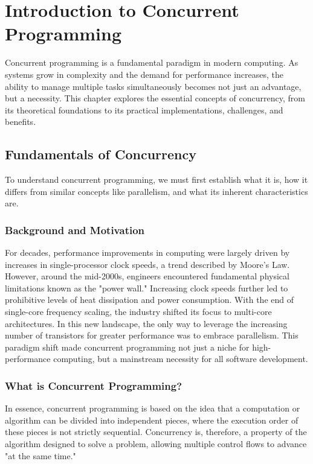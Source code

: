 \chapter{Introduction to Concurrent Programming}

Concurrent programming is a fundamental paradigm in modern computing. As systems grow in complexity and the demand for performance increases, the ability to manage multiple tasks simultaneously becomes not just an advantage, but a necessity. This chapter explores the essential concepts of concurrency, from its theoretical foundations to its practical implementations, challenges, and benefits.

\section{Fundamentals of Concurrency}

To understand concurrent programming, we must first establish what it is, how it differs from similar concepts like parallelism, and what its inherent characteristics are.

\subsection{Background and Motivation}
For decades, performance improvements in computing were largely driven by increases in single-processor clock speeds, a trend described by Moore's Law. However, around the mid-2000s, engineers encountered fundamental physical limitations known as the "power wall." Increasing clock speeds further led to prohibitive levels of heat dissipation and power consumption. With the end of single-core frequency scaling, the industry shifted its focus to multi-core architectures. In this new landscape, the only way to leverage the increasing number of transistors for greater performance was to embrace parallelism. This paradigm shift made concurrent programming not just a niche for high-performance computing, but a mainstream necessity for all software development.

\subsection{What is Concurrent Programming?}

In essence, concurrent programming is based on the idea that a computation or algorithm can be divided into independent pieces, where the execution order of these pieces is not strictly sequential. Concurrency is, therefore, a property of the algorithm designed to solve a problem, allowing multiple control flows to advance "at the same time."

